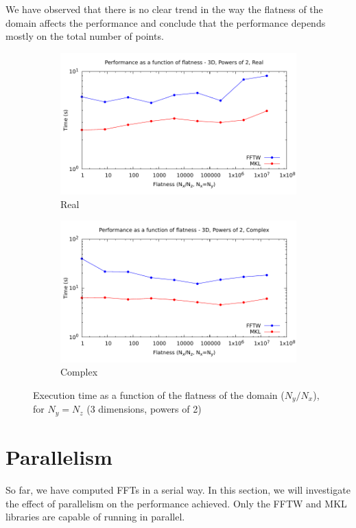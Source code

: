 \documentclass[12pt, a4paper]{article}
\begin{document}
We have observed that there is no clear trend in the way the flatness of the domain affects the performance and conclude that the performance depends mostly on the total number of points.\\

\begin{figure}[H]
\captionsetup{width=0.8\linewidth}
\centering
\begin{subfigure}{.5\textwidth}
\centering
\includegraphics[width=.9\linewidth]{graphs/flatness-r.pdf}
\caption{Real}
\label{FLATNESSR}
\end{subfigure}%
\begin{subfigure}{.5\textwidth}
\centering
\includegraphics[width=.9\linewidth]{graphs/flatness-c.pdf}
\caption{Complex}
\label{FLATNESSC}
\end{subfigure}
\caption{Execution time as a function of the flatness of the domain ($N_y/N_x$), for $N_y=N_z$ (3 dimensions, powers of 2)}
\label{FLATNESS}
\end{figure}
\pagebreak
\section{Parallelism}\label{PARALLELISM}
So far, we have computed FFTs in a serial way. In this section, we will investigate the effect of parallelism on the performance achieved. Only the FFTW and MKL libraries are capable of running in parallel.  
\end{document}

